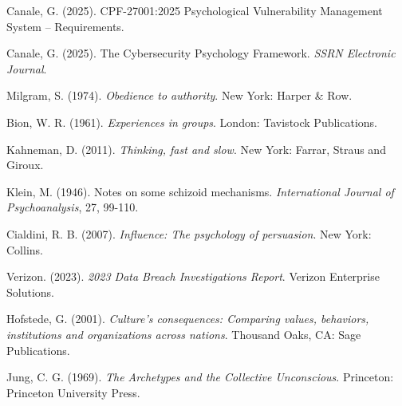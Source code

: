 \documentclass[11pt,a4paper]{article}
\begin{document}

\begin{thebibliography}{99}

Canale, G. (2025). CPF-27001:2025 Psychological Vulnerability Management System -- Requirements.

Canale, G. (2025). The Cybersecurity Psychology Framework. \textit{SSRN Electronic Journal}.

Milgram, S. (1974). \textit{Obedience to authority}. New York: Harper \& Row.

Bion, W. R. (1961). \textit{Experiences in groups}. London: Tavistock Publications.

Kahneman, D. (2011). \textit{Thinking, fast and slow}. New York: Farrar, Straus and Giroux.

Klein, M. (1946). Notes on some schizoid mechanisms. \textit{International Journal of Psychoanalysis}, 27, 99-110.

Cialdini, R. B. (2007). \textit{Influence: The psychology of persuasion}. New York: Collins.

Verizon. (2023). \textit{2023 Data Breach Investigations Report}. Verizon Enterprise Solutions.

Hofstede, G. (2001). \textit{Culture's consequences: Comparing values, behaviors, institutions and organizations across nations}. Thousand Oaks, CA: Sage Publications.

Jung, C. G. (1969). \textit{The Archetypes and the Collective Unconscious}. Princeton: Princeton University Press.

\end{thebibliography}
\end{document}
